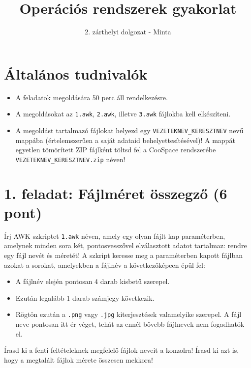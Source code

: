 \documentclass[a4paper,12pt]{article}
\begin{document}
\title{\vspace{-22mm}Operációs rendszerek gyakorlat}
\author{}
\date{\vspace{-2mm}2. zárthelyi dolgozat - Minta}

\maketitle

\section*{Általános tudnivalók}
\begin{itemize}
    \item A feladatok megoldására 50 perc áll rendelkezésre.
    \item A megoldásokat az \texttt{1.awk}, \texttt{2.awk}, illetve \texttt{3.awk} fájlokba kell elkészíteni.
    \item A megoldást tartalmazó fájlokat helyezd egy \texttt{VEZETEKNEV\_KERESZTNEV} nevű mappába (értelemszerűen a saját adataid behelyettesítésével)! A mappát egyetlen tömörített ZIP fájlként töltsd fel a CooSpace rendszerébe \texttt{VEZETEKNEV\_KERESZTNEV.zip} néven!
\end{itemize}

\section*{1. feladat: Fájlméret összegző (6 pont)}
Írj AWK szkriptet \texttt{1.awk} néven, amely egy olyan fájlt kap paraméterben, amelynek minden sora két, pontosvesszővel elválasztott adatot tartalmaz: rendre egy fájl nevét és méretét! A szkript keresse meg a paraméterben kapott fájlban azokat a sorokat, amelyekben a fájlnév a következőképeen épül fel:
\begin{itemize}
    \item A fájlnév elején pontosan 4 darab kisbetű szerepel.
    \item Ezután legalább 1 darab számjegy következik.
    \item Rögtön ezután a \texttt{.png} vagy \texttt{.jpg} kiterjesztések valamelyike szerepel. A fájl neve pontosan itt ér véget, tehát az ennél bővebb fájlnevek nem fogadhatók el.
\end{itemize}

Írasd ki a fenti feltételeknek megfelelő fájlok neveit a konzolra! Írasd ki azt is, hogy a megtalált fájlok mérete összesen mekkora!
\end{document}
